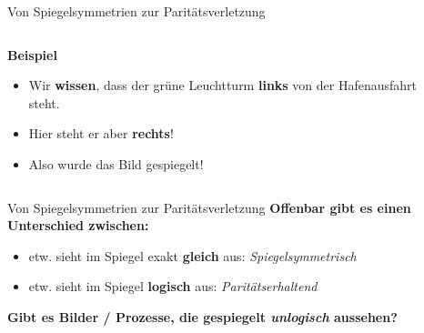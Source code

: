 \begin{frame}{Von Spiegelsymmetrien zur Parit\"atsverletzung}
	\begin{columns}[T]
		\begin{column}{.6\textwidth}
            \textbf{Beispiel}
            \begin{itemize}
                \item Wir \textbf{wissen}, dass der gr\"une Leuchtturm \textbf{links} von der Hafenausfahrt steht.
                \item Hier steht er aber \textbf{rechts}!
                \item Also wurde das Bild gespiegelt!
            \end{itemize}

		\end{column}
		\begin{column}{.4\textwidth}
			\centering
		\end{column}
    \end{columns}
\end{frame}

\begin{frame}{Von Spiegelsymmetrien zur Parit\"atsverletzung}
    \textbf{Offenbar gibt es einen Unterschied zwischen:}
    \begin{itemize}
        \item etw. sieht im Spiegel exakt \textbf{gleich} aus: \textcolor{vertexDarkRed}{\textit{Spiegelsymmetrisch}}
        \item etw. sieht im Spiegel \textbf{logisch} aus: \textcolor{vertexDarkRed}{\textit{Parit\"atserhaltend}}
    \end{itemize}
    \vspace*{.5cm}
    \centering
    \textbf{Gibt es Bilder / Prozesse, die gespiegelt {\color{vertexDarkRed}\textit{unlogisch}} aussehen?}
\end{frame}

